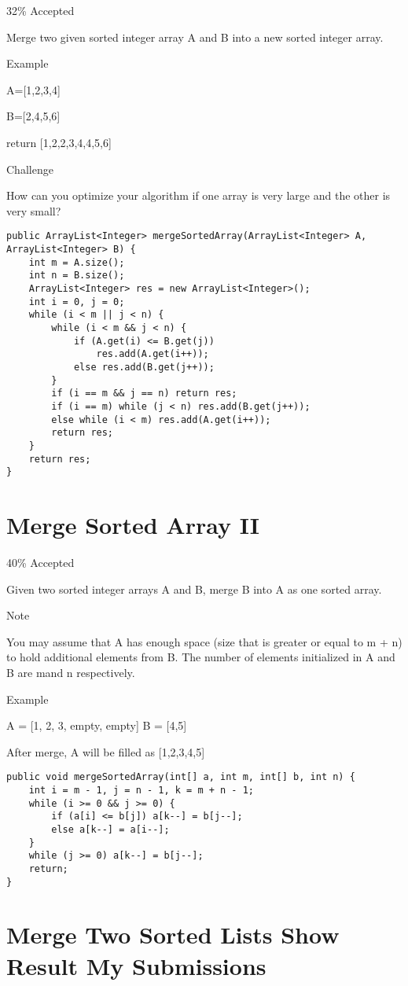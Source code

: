 \documentclass[12pt]{book}
\begin{document}
32\% Accepted

Merge two given sorted integer array A and B into a new sorted integer array.

Example

A=[1,2,3,4]

B=[2,4,5,6]

return [1,2,2,3,4,4,5,6]

Challenge

How can you optimize your algorithm if one array is very large and the other is very small?
\lstset{language=java,label= ,caption= ,numbers=none}
\begin{lstlisting}
public ArrayList<Integer> mergeSortedArray(ArrayList<Integer> A, ArrayList<Integer> B) {
    int m = A.size();
    int n = B.size();
    ArrayList<Integer> res = new ArrayList<Integer>();
    int i = 0, j = 0;
    while (i < m || j < n) {
        while (i < m && j < n) {
            if (A.get(i) <= B.get(j)) 
                res.add(A.get(i++));
            else res.add(B.get(j++));
        }
        if (i == m && j == n) return res;
        if (i == m) while (j < n) res.add(B.get(j++));
        else while (i < m) res.add(A.get(i++));
        return res;
    }
    return res;
}
\end{lstlisting}
\chapter{Merge Sorted Array II}
\label{sec-42}

40\% Accepted

Given two sorted integer arrays A and B, merge B into A as one sorted array.

Note

You may assume that A has enough space (size that is greater or equal to m + n) to hold additional elements from B. The number of elements initialized in A and B are mand n respectively.

Example

A = [1, 2, 3, empty, empty] B = [4,5]

After merge, A will be filled as [1,2,3,4,5]
\lstset{language=java,label= ,caption= ,numbers=none}
\begin{lstlisting}
public void mergeSortedArray(int[] a, int m, int[] b, int n) {
    int i = m - 1, j = n - 1, k = m + n - 1;
    while (i >= 0 && j >= 0) {
        if (a[i] <= b[j]) a[k--] = b[j--];
        else a[k--] = a[i--];
    }
    while (j >= 0) a[k--] = b[j--];
    return;
}
\end{lstlisting}
\chapter{Merge Two Sorted Lists Show Result My Submissions}
\label{sec-43}
\end{document}
